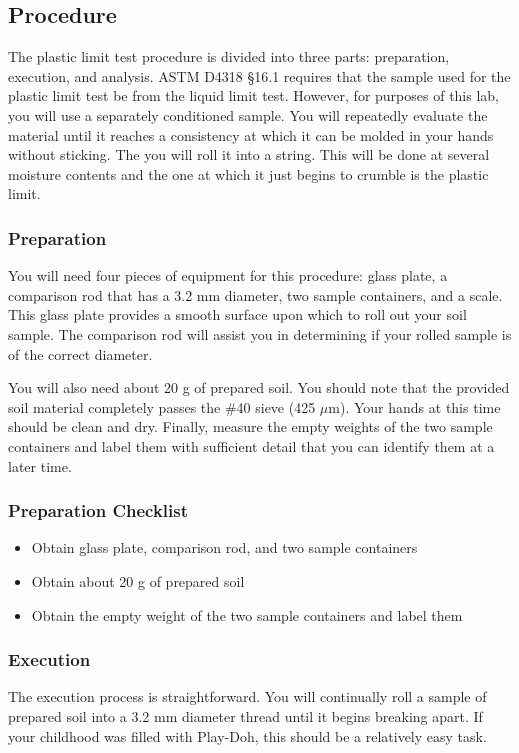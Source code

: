 \documentclass[12pt]{article}
\begin{document}
\pagebreak
\subsection{Procedure}
The plastic limit test procedure is divided into three parts: preparation, execution, and analysis. ASTM D4318 \S16.1 requires that the sample used for the plastic limit test be from the liquid limit test. However, for purposes of this lab, you will use a separately conditioned sample. You will repeatedly evaluate the material until it reaches a consistency at which it can be molded in your hands without sticking. The you will roll it into a string. This will be done at several moisture contents and the one at which it just begins to crumble is the plastic limit.

\subsubsection{Preparation}
You will need four pieces of equipment for this procedure: glass plate, a comparison rod that has a 3.2 mm diameter, two sample containers, and a scale. This glass plate provides a smooth surface upon which to roll out your soil sample. The comparison rod will assist you in determining if your rolled sample is of the correct diameter.

You will also need about 20 g of prepared soil. You should note that the provided soil material completely passes the \#40 sieve (425 $\mu$m). Your hands at this time should be clean and dry. Finally, measure the empty weights of the two sample containers and label them with sufficient detail that you can identify them at a later time.

\subsubsection*{Preparation Checklist}
\begin{itemize}
    \item Obtain glass plate, comparison rod, and two sample containers
    \item Obtain about 20 g of prepared soil
    \item Obtain the empty weight of the two sample containers and label them
\end{itemize}

\subsubsection{Execution}
The execution process is straightforward. You will continually roll a sample of prepared soil into a 3.2 mm diameter thread until it begins breaking apart. If your childhood was filled with Play-Doh\textregistered{}, this should be a relatively easy task.
\end{document}
